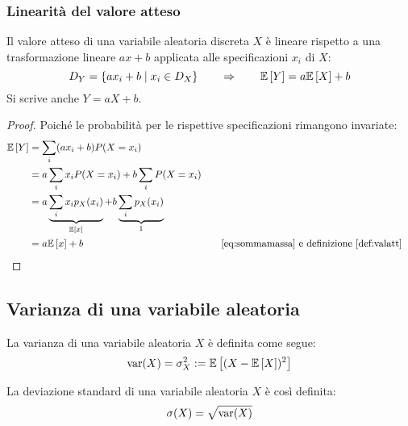 \subsubsection{Linearità del valore atteso}
\begin{prop}
	Il valore atteso di una variabile aleatoria discreta $X$ è lineare rispetto a una trasformazione lineare $ax+b$ applicata alle specificazioni $x_i$ di $X$:
	\begin{equation*}
		D_Y = \{ax_i+b \mid x_i\in D_X\} \qquad\Rightarrow\qquad \mathbb{E}\left[ Y \right]=a\mathbb{E}\left[ X \right]+b
	\end{equation*}
	Si scrive anche $Y=aX+b$.
\end{prop}
\begin{proof}
	Poiché le probabilità per le rispettive specificazioni rimangono invariate:
	\begin{align*}
		\mathbb{E}\left[ Y \right] & = \sum_i (a x_i + b) P(X=x_i)                                                    \\
		       & = a\sum_i x_i P(X=x_i) + b\sum_i P(X=x_i)                                        \\
		       & = a\underbrace{\sum_i x_i p_X(x_i)}_{\mathbb{E}\left[ x \right]} + b\underbrace{\sum_i p_X(x_i)}_{1} \\
		       & = a \mathbb{E}\left[ x \right] + b & \quad & \text{\eqref{eq:sommamassa} e definizione \ref{def:valatt}}
	\end{align*}
\end{proof}



\subsection{Varianza di una variabile aleatoria}
\begin{defin}
	La varianza di una variabile aleatoria $X$ è definita come segue:
	\begin{equation*}
		\operatorname{var}(X) = \sigma^2_X := \mathbb{E}\left[ (X-\mathbb{E}\left[ X \right])^2 \right]
	\end{equation*}
\end{defin}

\begin{defin}
	La deviazione standard di una variabile aleatoria $X$ è così definita:
	\begin{equation*}
		\sigma(X)=\sqrt{\operatorname{var}(X)}
	\end{equation*}
\end{defin}



